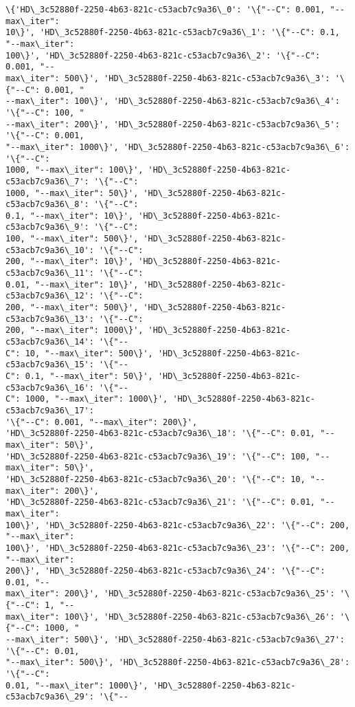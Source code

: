 \documentclass[11pt]{article}
\begin{document}
    \begin{Verbatim}[commandchars=\\\{\}]
\{'HD\_3c52880f-2250-4b63-821c-c53acb7c9a36\_0': '\{"--C": 0.001, "--max\_iter":
10\}', 'HD\_3c52880f-2250-4b63-821c-c53acb7c9a36\_1': '\{"--C": 0.1, "--max\_iter":
100\}', 'HD\_3c52880f-2250-4b63-821c-c53acb7c9a36\_2': '\{"--C": 0.001, "--
max\_iter": 500\}', 'HD\_3c52880f-2250-4b63-821c-c53acb7c9a36\_3': '\{"--C": 0.001, "
--max\_iter": 100\}', 'HD\_3c52880f-2250-4b63-821c-c53acb7c9a36\_4': '\{"--C": 100, "
--max\_iter": 200\}', 'HD\_3c52880f-2250-4b63-821c-c53acb7c9a36\_5': '\{"--C": 0.001,
"--max\_iter": 1000\}', 'HD\_3c52880f-2250-4b63-821c-c53acb7c9a36\_6': '\{"--C":
1000, "--max\_iter": 100\}', 'HD\_3c52880f-2250-4b63-821c-c53acb7c9a36\_7': '\{"--C":
1000, "--max\_iter": 50\}', 'HD\_3c52880f-2250-4b63-821c-c53acb7c9a36\_8': '\{"--C":
0.1, "--max\_iter": 10\}', 'HD\_3c52880f-2250-4b63-821c-c53acb7c9a36\_9': '\{"--C":
100, "--max\_iter": 500\}', 'HD\_3c52880f-2250-4b63-821c-c53acb7c9a36\_10': '\{"--C":
200, "--max\_iter": 10\}', 'HD\_3c52880f-2250-4b63-821c-c53acb7c9a36\_11': '\{"--C":
0.01, "--max\_iter": 10\}', 'HD\_3c52880f-2250-4b63-821c-c53acb7c9a36\_12': '\{"--C":
200, "--max\_iter": 500\}', 'HD\_3c52880f-2250-4b63-821c-c53acb7c9a36\_13': '\{"--C":
200, "--max\_iter": 1000\}', 'HD\_3c52880f-2250-4b63-821c-c53acb7c9a36\_14': '\{"--
C": 10, "--max\_iter": 500\}', 'HD\_3c52880f-2250-4b63-821c-c53acb7c9a36\_15': '\{"--
C": 0.1, "--max\_iter": 50\}', 'HD\_3c52880f-2250-4b63-821c-c53acb7c9a36\_16': '\{"--
C": 1000, "--max\_iter": 1000\}', 'HD\_3c52880f-2250-4b63-821c-c53acb7c9a36\_17':
'\{"--C": 0.001, "--max\_iter": 200\}',
'HD\_3c52880f-2250-4b63-821c-c53acb7c9a36\_18': '\{"--C": 0.01, "--max\_iter": 50\}',
'HD\_3c52880f-2250-4b63-821c-c53acb7c9a36\_19': '\{"--C": 100, "--max\_iter": 50\}',
'HD\_3c52880f-2250-4b63-821c-c53acb7c9a36\_20': '\{"--C": 10, "--max\_iter": 200\}',
'HD\_3c52880f-2250-4b63-821c-c53acb7c9a36\_21': '\{"--C": 0.01, "--max\_iter":
100\}', 'HD\_3c52880f-2250-4b63-821c-c53acb7c9a36\_22': '\{"--C": 200, "--max\_iter":
100\}', 'HD\_3c52880f-2250-4b63-821c-c53acb7c9a36\_23': '\{"--C": 200, "--max\_iter":
200\}', 'HD\_3c52880f-2250-4b63-821c-c53acb7c9a36\_24': '\{"--C": 0.01, "--
max\_iter": 200\}', 'HD\_3c52880f-2250-4b63-821c-c53acb7c9a36\_25': '\{"--C": 1, "--
max\_iter": 100\}', 'HD\_3c52880f-2250-4b63-821c-c53acb7c9a36\_26': '\{"--C": 1000, "
--max\_iter": 500\}', 'HD\_3c52880f-2250-4b63-821c-c53acb7c9a36\_27': '\{"--C": 0.01,
"--max\_iter": 500\}', 'HD\_3c52880f-2250-4b63-821c-c53acb7c9a36\_28': '\{"--C":
0.01, "--max\_iter": 1000\}', 'HD\_3c52880f-2250-4b63-821c-c53acb7c9a36\_29': '\{"--

\end{Verbatim}
\end{document}
